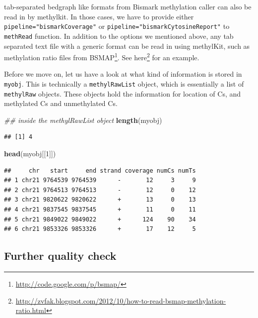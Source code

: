 \documentclass[12pt,]{krantz}
\newenvironment{Shaded}{\begin{snugshade}}{\end{snugshade}}
\newcommand{\CommentTok}[1]{\textcolor[rgb]{0.56,0.35,0.01}{\textit{#1}}}
\newcommand{\DecValTok}[1]{\textcolor[rgb]{0.00,0.00,0.81}{#1}}
\newcommand{\KeywordTok}[1]{\textcolor[rgb]{0.13,0.29,0.53}{\textbf{#1}}}
\newcommand{\NormalTok}[1]{#1}
\renewcommand{\href}[2]{#2\footnote{\url{#1}}}
\begin{document}
tab-separated bedgraph like formats from Bismark methylation caller can also be read in by methylkit. In those cases, we have to provide either \texttt{pipeline="bismarkCoverage"} or \texttt{pipeline="bismarkCytosineReport"} to \texttt{methRead} function. In addition to the options we mentioned above,
any tab separated text file with a generic format can be read in using methylKit,
such as methylation ratio files from \href{http://code.google.com/p/bsmap/}{BSMAP}.
See \href{http://zvfak.blogspot.com/2012/10/how-to-read-bsmap-methylation-ratio.html}{here} for an example.

Before we move on, let us have a look at what kind of information is stored in \texttt{myobj}. This is technically a \texttt{methylRawList} object, which is essentially a list of \texttt{methylRaw} objects. These objects hold
the information for location of Cs, and methylated Cs and unmethylated Cs.

\begin{Shaded}
\begin{Highlighting}[]
\CommentTok{## inside the methylRawList object}
\KeywordTok{length}\NormalTok{(myobj)}
\end{Highlighting}
\end{Shaded}

\begin{verbatim}
## [1] 4
\end{verbatim}

\begin{Shaded}
\begin{Highlighting}[]
\KeywordTok{head}\NormalTok{(myobj[[}\DecValTok{1}\NormalTok{]])}
\end{Highlighting}
\end{Shaded}

\begin{verbatim}
##     chr   start     end strand coverage numCs numTs
## 1 chr21 9764539 9764539      -       12     3     9
## 2 chr21 9764513 9764513      -       12     0    12
## 3 chr21 9820622 9820622      +       13     0    13
## 4 chr21 9837545 9837545      +       11     0    11
## 5 chr21 9849022 9849022      +      124    90    34
## 6 chr21 9853326 9853326      +       17    12     5
\end{verbatim}

\hypertarget{further-quality-check}{%
\subsection{Further quality check}\label{further-quality-check}}
\end{document}
